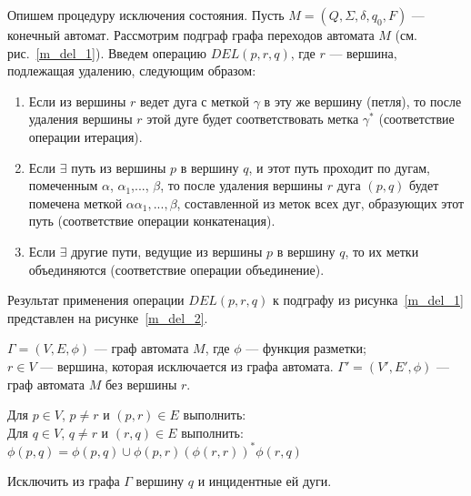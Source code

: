 Опишем процедуру исключения состояния.
Пусть $M = (Q, \Sigma, \delta, q_0, F)$ --- конечный автомат. Рассмотрим подграф графа переходов автомата $M$ (см. рис.~\ref{m_del_1}). Введем операцию $DEL(p, r, q)$, где $r$ --- вершина, подлежащая удалению, следующим образом:
\begin{enumerate}
	\item Если из вершины $r$ ведет дуга с меткой $\gamma$ в эту же вершину (петля), то после удаления вершины $r$ этой дуге будет соответствовать метка $\gamma^*$ (соответствие операции итерация).
	\item Если $\exists$ путь из вершины $p$ в вершину $q$, и этот путь проходит по дугам, помеченным $\alpha$, $\alpha_1$,..., $\beta$, то после удаления вершины $r$ дуга $(p, q)$ будет помечена меткой $\alpha\alpha_1,...,\beta$, составленной из меток всех дуг, образующих этот путь (соответствие операции конкатенация).
	\item Если $\exists$ другие пути, ведущие из вершины $p$ в вершину $q$, то их метки объединяются (соответствие операции объединение).
\end{enumerate}
Результат применения операции $DEL(p, r, q)$ к подграфу из рисунка~\ref{m_del_1} представлен на рисунке~\ref{m_del_2}.


{
	$\Gamma = (V, E, \phi)$ --- граф автомата $M$, где $\phi$ --- функция разметки; \\
	$r \in V$ --- вершина, которая исключается из графа автомата.
}
{$\Gamma' = (V', E', \phi)$ --- граф автомата $M$ без вершины $r$.}
{ }
{
\item Для $p \in V$, $p \neq r$ и $(p, r) \in E$ выполнить: \\
			Для $q \in V$, $q \neq r$ и $(r, q) \in E$ выполнить: \\
			$\phi(p, q) = \phi(p, q) \cup \phi(p, r)(\phi(r, r))^*\phi(r, q)$
\item  Исключить из графа $\Gamma$ вершину $q$ и инцидентные ей дуги.
}

